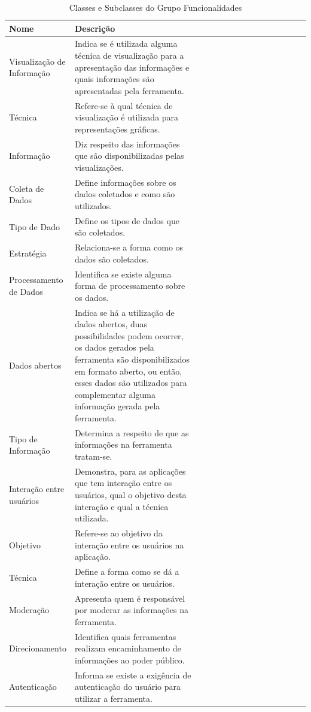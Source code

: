 \begin{table}[!ht]
    \centering
    \caption{Classes e Subclasses do Grupo Funcionalidades}
    \label{tab:classesFuncionalidades}
    \begin{tabular}{l*{2}{>{\raggedright\arraybackslash}p{0.5\linewidth}}}
    \toprule
        Nome                       & Descrição \\ 
    \midrule
        Visualização de Informação & Indica se é utilizada alguma técnica de visualização para a apresentação das informações e quais informações são apresentadas pela ferramenta.\\
        Técnica                    & Refere-se à qual técnica de visualização é utilizada para representações gráficas.\\
        Informação                 & Diz respeito das informações que são disponibilizadas pelas visualizações.\\
        Coleta de Dados            & Define informações sobre os dados coletados e como são utilizados.\\
        Tipo de Dado               & Define os tipos de dados que são coletados.\\
        Estratégia                 & Relaciona-se a forma como os dados são coletados.\\
        Processamento de Dados     & Identifica se existe alguma forma de processamento sobre os dados.\\
        Dados abertos              & Indica se há a utilização de dados abertos, duas possibilidades podem ocorrer, os dados gerados pela ferramenta são disponibilizados em formato aberto, ou então, esses dados são utilizados para complementar alguma informação gerada pela ferramenta.\\
        Tipo de Informação         & Determina a respeito de que as informações na ferramenta tratam-se.\\
        Interação entre usuários   & Demonstra, para as aplicações que tem interação entre os usuários, qual o objetivo desta interação e qual a técnica utilizada.\\
        Objetivo                   & Refere-se ao objetivo da interação entre os usuários na aplicação.\\
        Técnica	                   & Define a forma como se dá a interação entre os usuários.\\
        Moderação                  & Apresenta quem é responsável por moderar as informações na ferramenta.\\
        Direcionamento             & Identifica quais ferramentas realizam encaminhamento de informações ao poder público.\\
        Autenticação               & Informa se existe a exigência de autenticação do usuário para utilizar a ferramenta.\\
    \bottomrule
    \end{tabular}
\end{table}
